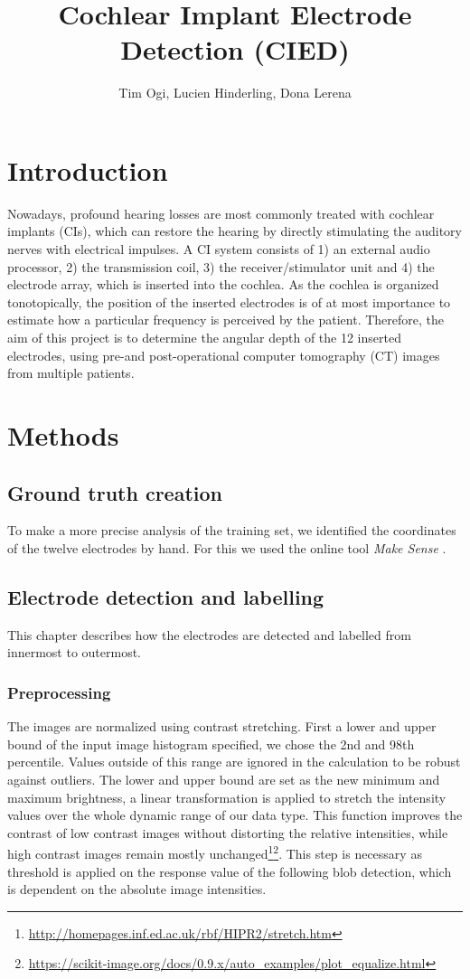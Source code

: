 \documentclass[a4paper, 11pt]{article}
\title{\textbf{Cochlear Implant Electrode Detection (CIED)}}
\author{Tim Ogi, Lucien Hinderling, Dona Lerena}
\begin{document}
\maketitle
\section{Introduction}
Nowadays, profound hearing losses are most commonly treated with cochlear implants (CIs), which can restore the hearing by directly stimulating the auditory nerves with electrical impulses. A CI system consists of 1) an external audio processor, 2) the transmission coil, 3) the receiver/stimulator unit and 4) the electrode array, which is inserted into the cochlea. As the cochlea is organized tonotopically, the position of the inserted electrodes is of at most importance to estimate how a particular frequency is perceived by the patient. Therefore, the aim of this project is to determine the angular depth of the 12 inserted electrodes, using pre-and post-operational computer tomography (CT) images from multiple patients.


\section{Methods}
\subsection{Ground truth creation}
To make a more precise analysis of the training set, we identified the coordinates of the twelve electrodes by hand. For this we used the online tool  \emph{Make Sense} \cite{makesense} .
\subsection{Electrode detection and labelling}
This chapter describes how the electrodes are detected and labelled from innermost to outermost. 
\subsubsection{Preprocessing}
The images are normalized using contrast stretching. First a lower and upper bound of the input image histogram specified, we chose the 2nd and 98th percentile. Values outside of this range are ignored in the calculation to be robust against outliers. The lower and upper bound are set as the new minimum and maximum brightness, a linear transformation is applied to stretch the intensity values over the whole dynamic range of our data type. This function improves the contrast of low contrast images without distorting the relative intensities, while high contrast images remain mostly unchanged\footnote{\url{http://homepages.inf.ed.ac.uk/rbf/HIPR2/stretch.htm}}\footnote{\url{https://scikit-image.org/docs/0.9.x/auto_examples/plot_equalize.html}}. This step is necessary as threshold is applied on the response value of the following blob detection, which is dependent on the absolute image intensities.
\end{document}
